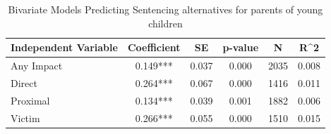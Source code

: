 \begin{table}

\caption{\label{tab:tab:q25_6_rev_bivariate}Bivariate Models Predicting Sentencing alternatives for parents of young children}
\centering
\begin{tabular}[t]{lccccc}
\toprule
Independent Variable & Coefficient & SE & p-value & N & R\textasciicircum{}2\\
\midrule
Any Impact & 0.149*** & 0.037 & 0.000 & 2035 & 0.008\\
Direct & 0.264*** & 0.067 & 0.000 & 1416 & 0.011\\
Proximal & 0.134*** & 0.039 & 0.001 & 1882 & 0.006\\
Victim & 0.266*** & 0.055 & 0.000 & 1510 & 0.015\\
\bottomrule
\end{tabular}
\end{table}
